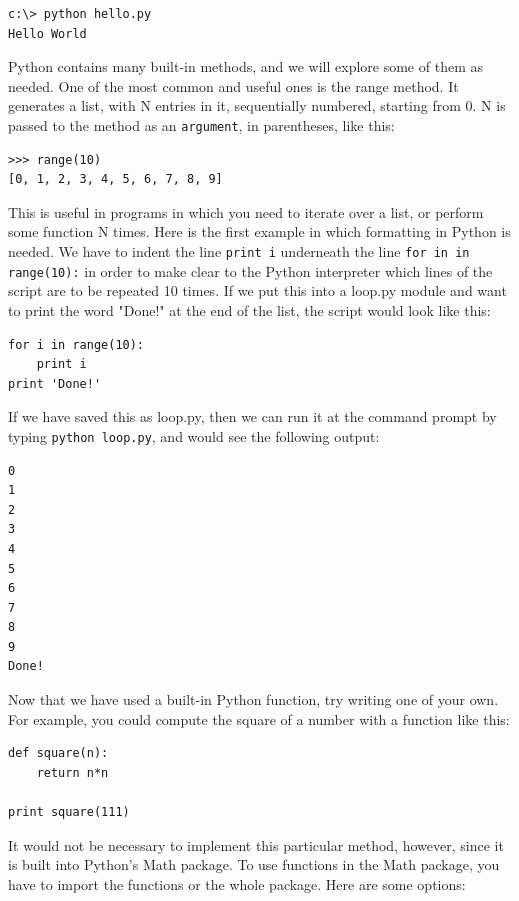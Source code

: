 \begin{lstlisting}
c:\> python hello.py
Hello World
\end{lstlisting}

Python contains many built-in methods, and we will explore some of them as needed.  One of the most common and useful ones is the range method.  It generates a list, with N entries in it, sequentially numbered, starting from 0.  N is passed to the method as an \verb#argument#, in parentheses, like this:

\begin{lstlisting}
>>> range(10)
[0, 1, 2, 3, 4, 5, 6, 7, 8, 9]
\end{lstlisting}

This is useful in programs in which you need to iterate over a list, or perform some function N times.  Here is the first example in which formatting in Python is needed.  We have to indent the line \verb#print i# underneath the line \verb#for in in range(10):# in order to make clear to the Python interpreter which lines of the script are to be repeated 10 times.  If we put this into a loop.py module and want to print the word "Done!" at the end of the list, the script would look like this:

\begin{lstlisting}
for i in range(10):
    print i
print 'Done!'
\end{lstlisting}

If we have saved this as loop.py, then we can run it at the command prompt by typing \verb#python loop.py#, and would see the following output:

\begin{lstlisting}
0
1
2
3
4
5
6
7
8
9
Done!
\end{lstlisting}



Now that we have used a built-in Python function, try writing one of your own.  For example, you could compute the square of a number with a function like this:

\begin{lstlisting}
def square(n):
    return n*n

print square(111)
\end{lstlisting}

It would not be necessary to implement this particular method, however, since it is built into Python's Math package.  To use functions in the Math package, you have to import the functions or the whole package.  Here are some options:

